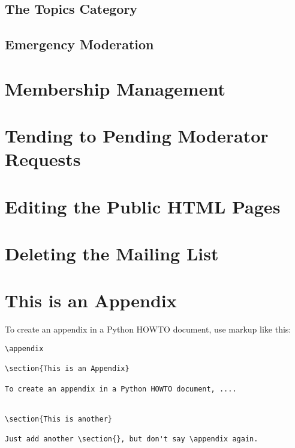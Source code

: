 \documentclass{howto}
\begin{document}
\subsection{The Topics Category}
\subsection{Emergency Moderation}

\section{Membership Management}
\section{Tending to Pending Moderator Requests}
\section{Editing the Public HTML Pages}
\section{Deleting the Mailing List}

\appendix

\section{This is an Appendix}

To create an appendix in a Python HOWTO document, use markup like
this:

\begin{verbatim}
\appendix

\section{This is an Appendix}

To create an appendix in a Python HOWTO document, ....


\section{This is another}

Just add another \section{}, but don't say \appendix again.
\end{verbatim}
\end{document}
